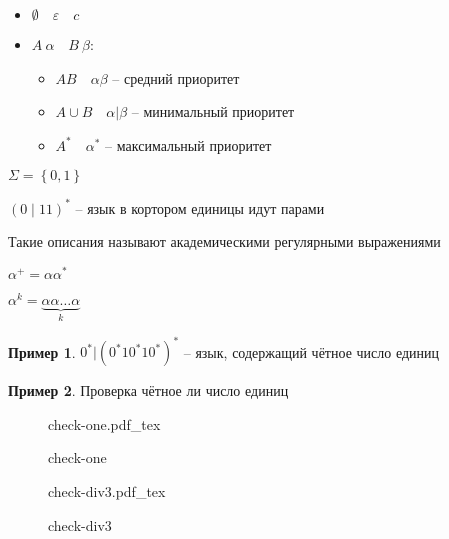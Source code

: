 \documentclass{book}
\renewcommand\O{\ensuremath{\emptyset}}
\theoremstyle{definition}
\newtheorem*{example}{Пример}
\newcommand{\incfig}[1]{%
    \def\svgwidth{\columnwidth}
    {#1.pdf_tex}
}
\begin{document}
\begin{definition}
    [Описание]
    \begin{itemize}
        \item $\O \quad \varepsilon\quad c$
        \item $A\ \alpha\quad B\  \beta$:
             \begin{itemize}
                \item $AB\quad \alpha\beta$ -- средний приоритет
                \item $A \cup B\quad \alpha |\beta$ -- минимальный приоритет
                \item $A^*\quad \alpha^*$ -- максимальный приоритет
            \end{itemize}
    \end{itemize}

    $\Sigma = \left\{ 0,1 \right\} $ 

    $\left( 0\mid 11 \right)^* $ -- язык в кортором единицы идут парами

    Такие описания называют академическими регулярными выражениями

    $\alpha^+ = \alpha\alpha^*$

    $\alpha^k = \underbrace{\alpha\alpha \ldots \alpha}_{k}$
\end{definition}

\begin{example}
    $0^*|\left( 0^*10^*10^* \right)^*$ -- язык, содержащий чётное число единиц
\end{example}

\begin{example}
    Проверка чётное ли число единиц

\begin{figure}[!ht]
    \centering
    \incfig{check-one}
    \caption{check-one}
    \label{fig:check-one}
\end{figure}

\begin{figure}[!ht]
    \centering
    \incfig{check-div3}
    \caption{check-div3}
    \label{fig:check-div3}
\end{figure}
\end{example}
\end{document}
